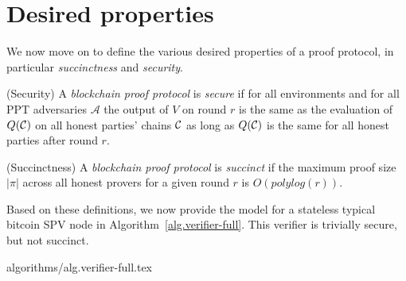 \section{Desired properties}

We now move on to define the various desired properties of a proof protocol, in
particular \textit{succinctness} and \textit{security}.

\begin{definition}{(Security)}
A \textit{blockchain proof protocol} is \textit{secure} if for all environments
and for all PPT adversaries $\mathcal{A}$ the output of $V$ on round $r$ is the
same as the evaluation of $Q(\mathcal{C})$ on all honest parties' chains $\mathcal{C}$ as
long as $Q(\mathcal{C})$ is the same for all honest parties after round $r$.
\end{definition}

\begin{definition}{(Succinctness)}
A \textit{blockchain proof protocol} is \textit{succinct} if the maximum proof
size $|\pi|$ across all honest provers for a given round $r$ is
$O(polylog(r))$.
\end{definition}

Based on these definitions, we now provide the model for a stateless typical
bitcoin SPV node in Algorithm~\ref{alg.verifier-full}. This verifier is
trivially secure, but not succinct.

{algorithms/alg.verifier-full.tex}
